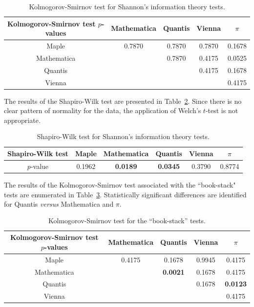\documentclass[%
 preprint,
 showpacs,
 showkeys,
 preprintnumbers,
 amsmath,amssymb,
 aps,
 prl,
  longbibliography,
 ]{revtex4-1}
\begin{document}
\begin{table}
\caption{Kolmogorov-Smirnov test for Shannon's information theory tests.}\label{tab:6}
 \begin{center}
 \begin{tabular}
[c]{ c c c c c }
\hline\hline
Kolmogorov-Smirnov test $p$-values & Mathematica & Quantis & Vienna & $\pi$ \\\hline
Maple & 0.7870 & 0.7870 & 0.7870 & 0.1678\\
Mathematica &  & 0.7870 & 0.4175 & 0.0525\\
Quantis &  &  & 0.4175 & 0.1678\\
Vienna &  &  &  & 0.4175\\\hline\hline
\end{tabular}
\end{center}
\end{table}



The results of the Shapiro-Wilk test are presented in Table~\ref{tab:7}.
Since there is no clear
pattern of normality for the data, the application of Welch's $t$-test is not
appropriate.


\begin{table}
\caption{Shapiro-Wilk test for Shannon's information theory tests.}\label{tab:7}
\begin{center}
\begin{tabular}
[c]{ c c c c c c }\hline\hline
Shapiro-Wilk test & Maple & Mathematica & Quantis  & Vienna  & $\pi$\\\hline
$p$-value & 0.1962 & \bf{0.0189} &
\bf{0.0345} & 0.3790 & 0.8774\\\hline\hline
\end{tabular}
\end{center}
\end{table}





The results of the Kolmogorov-Smirnov test associated with the ``book-stack" tests are enumerated in Table~\ref{tab:8}.
Statistically significant differences are identified for
Quantis {\it versus} Mathematica and $\pi$.



\begin{table}
\caption{Kolmogorov-Smirnov test for the ``book-stack'' tests.}\label{tab:8}
 \begin{center}
 \begin{tabular}
[c]{ c c c c c }
\hline\hline
Kolmogorov-Smirnov test $p$-values & Mathematica & Quantis & Vienna & $\pi$ \\\hline
Maple  & 0.4175 & 0.1678 & 0.9945 & 0.4175\\
Mathematica &  & \bf{0.0021} & 0.1678 & 0.4175\\
Quantis &  &  & 0.1678 & \bf{0.0123}\\
Vienna &  &  &  & 0.4175\\\hline\hline
\end{tabular}
\end{center}
\end{table}
\end{document}
